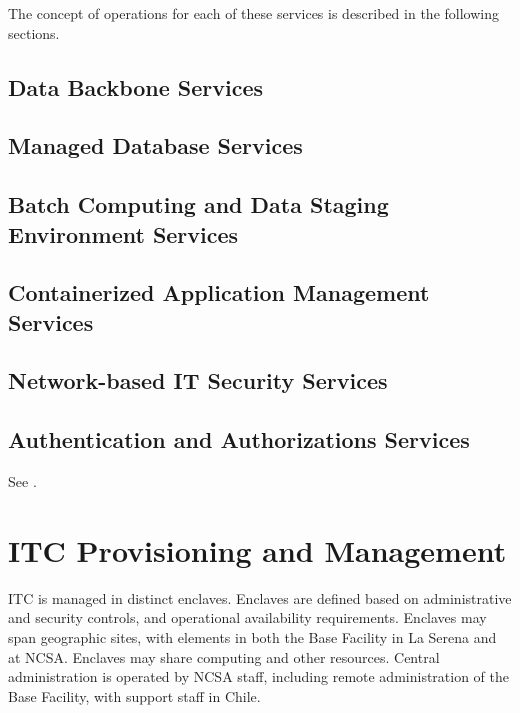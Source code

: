The concept of operations for each of these services is described in the
following sections.

\subsection{Data Backbone Services}


\subsection{Managed Database Services}


\subsection{Batch Computing and Data Staging Environment Services}


\subsection{Containerized Application Management Services}


\subsection{Network-based IT Security Services}


\subsection{Authentication and Authorizations Services}
See .

\section{ITC Provisioning and Management}

ITC is managed in distinct enclaves. Enclaves are defined based on administrative
and security controls, and operational availability requirements. Enclaves may
span geographic sites, with elements in both the Base Facility in La Serena and
at NCSA. Enclaves may share computing and other resources. 
Central administration is operated by NCSA staff, including remote administration of the Base Facility, 
with support staff in Chile.

